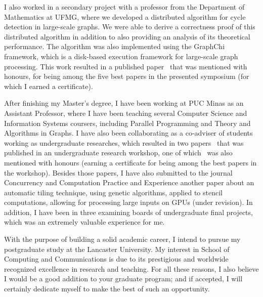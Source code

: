 \documentclass{article}
\begin{document}
I also worked in a secondary project with a professor from the Department of
Mathematics at UFMG, where we developed a distributed algorithm for cycle
detection in large-scale graphs. We were able to derive a correctness proof of
this distributed algorithm in addition to also providing an analysis of its
theoretical performance.  The algorithm was also implemented using the GraphChi
framework, which is a disk-based execution framework for large-scale graph
processing. This work resulted in a published paper~\cite{rocha2015cycles} that
was mentioned with honours, for being among the five best papers in the
presented symposium (for which I earned a certificate).

After finishing my Master's degree, I have been working at PUC Minas as an
Assistant Professor, where I have been teaching several Computer Science and
Information Systems coursers, including Parallel Programming and Theory and
Algorithms in Graphs.  I have also been collaborating as a co-adviser of
students working as undergraduate researches, which resulted in two
papers~\cite{saffran2015apriori,pereira2015stencilbench} that was published in
an undergraduate research workshop, one of which~\cite{pereira2015stencilbench}
was also mentioned with honours (earning a certificate for being among the best
papers in the workshop). Besides those papers, I have also submitted to the
journal Concurrency and Computation Practice and Experience another paper about
an automatic tiling technique, using genetic algorithms, applied to stencil
computations, allowing for processing large inputs on GPUs (under revision).
In addition, I have been in three examining boards of undergraduate final
projects, which was an extremely valuable experience for me.


With the purpose of building a solid academic career, I intend to pursue my
postgraduate study at the Lancaster University.  My interest in School of
Computing and Communications is due to its prestigious and worldwide recognized
excellence in research and teaching. For all these reasons, I also believe I
would be a good addition to your graduate program; and if accepted, I will
certainly dedicate myself to make the best of such an opportunity.

\nocite{*}


\end{document}

